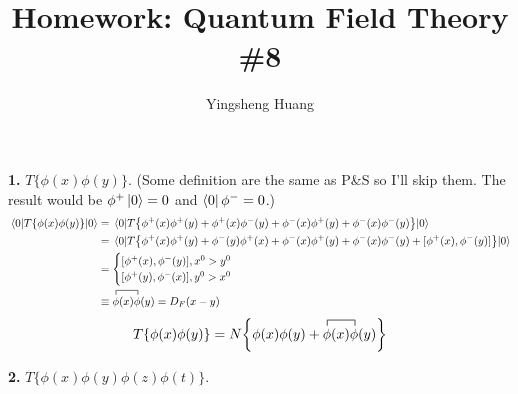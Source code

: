 \documentclass{article}
\title{Homework: Quantum Field Theory \#8}
\author{Yingsheng Huang}
\newcommand{\phixp}{\phi^+(x)}
\newcommand{\phixm}{\phi^-(x)}
\newcommand{\phiyp}{\phi^+(y)}
\newcommand{\phiym}{\phi^-(y)}
\begin{document}
\maketitle
{\bf1.}\quad
$T\{\phi(x)\phi(y)\}$. (Some definition are the same as P\&S so I'll skip them. The result would be $\phi^+\ket{0}=0$ and $\bra{0}\phi^-=0$.)
\begin{align*}
  \mel{0}{T\{\phi(x)\phi(y)\}}{0}&=\mel{0}{T\Bqty{\phixp\phiyp+\phixp\phiym+\phixm\phiyp+\phixm\phiym}}{0}\\
  &=\mel{0}{T\Bqty{\phixp\phiyp+\phiym\phixp+\phixm\phiyp+\phixm\phiym+[\phixp,\phiym]}}{0}\\
  &=\begin{cases}
  [\phixp,\phiym],x^0>y^0\\
  [\phiyp,\phixm],y^0>x^0
  \end{cases}\\
  &\equiv\contraction{}{\phi}{(x)}{\phi}\phi(x)\phi(y)=D_F(x-y)
\end{align*}
$$T\Bqty{\phi(x)\phi(y)}=N\Bqty{\phi(x)\phi(y)+\contraction{}{\phi}{(x)}{\phi}\phi(x)\phi(y)}$$

{\bf2.}\quad
$T\{\phi(x)\phi(y)\phi(z)\phi(t)\}$.
\end{document}

